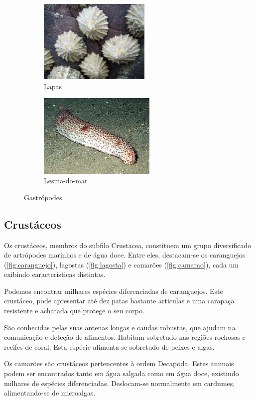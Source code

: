 \documentclass{report}
\begin{document}
\begin{figure}[H]
\center
    	\begin{subfigure}{.5\textwidth}
    	\center
        	\includegraphics[height=4cm]{imagens/lapas.jpg}
        	\caption{Lapas}
        	\label{fig:lapas}
    	\end{subfigure}%
   	\begin{subfigure}{.5\textwidth}
    	\center
        	\includegraphics[height=4cm]{imagens/lesma.jpg}
        	\caption{Lesma-do-mar}
       	\label{fig:lesma}
    	\end{subfigure}
    \caption{Gastrópodes}
    	\label{fig:gastropodes}
\end{figure}

\subsection{Crustáceos}
Os crustáceos, membros do subfilo Crustacea, constituem um grupo diversificado de artrópodes marinhos e de água doce. Entre eles, destacam-se os caranguejos (\ref{fig:caranguejo}), lagostas (\ref{fig:lagosta}) e camarões (\ref{fig:camarao}), cada um exibindo características distintas.

Podemos encontrar milhares espécies diferenciadas de caranguejos. Este crustáceo, pode apresentar até dez patas bastante articulas e uma carapaça resistente e achatada que protege o seu corpo.

São conhecidas pelas suas antenas longas e caudas robustas, que ajudam na comunicação e deteção de alimentos. Habitam sobretudo nas regiões rochosas e recifes de coral. Esta espécie alimenta-se sobretudo de peixes e algas.

Os camarões são crustáceos pertencentes à ordem Decapoda. Estes animais podem ser encontrados tanto em água salgada como em água doce, existindo milhares de espécies diferenciadas. Deslocam-se normalmente em cardumes, alimentando-se de microalgas.
\end{document}
